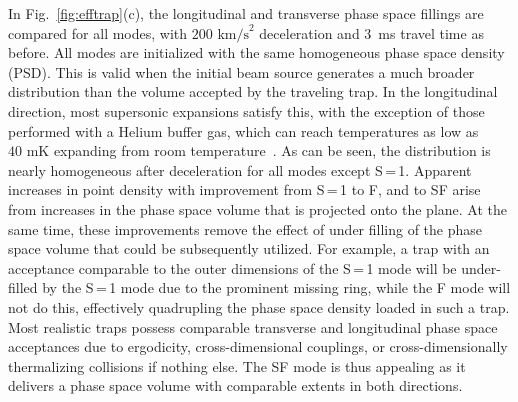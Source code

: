 \documentclass[%
 reprint,
 amsmath,amssymb,
 aps,
prl,
]{revtex4-1}
\begin{document}
In Fig.~\ref{fig:efftrap}(c), the longitudinal and transverse phase space fillings are compared for all modes, with $200\text{ km/s}^2$ deceleration and $3$~ms travel time as before. 
All modes are initialized with the same homogeneous phase space density (PSD).
This is valid when the initial beam source generates a much broader distribution than the volume accepted by the traveling trap.
In the longitudinal direction, most supersonic expansions satisfy this, with the exception of those performed with a Helium buffer gas, which can reach temperatures as low as $40\text{ mK}$ expanding from room temperature~\cite{Even2014}.
As can be seen, the distribution is nearly homogeneous after deceleration for all modes except S\,=\,1.
Apparent increases in point density with improvement from S\,=\,1 to F, and to SF arise from increases in the phase space volume that is projected onto the plane.
At the same time, these improvements remove the effect of under filling of the phase space volume that could be subsequently utilized.
For example, a trap with an acceptance comparable to the outer dimensions of the S\,=\,1 mode will be under-filled by the S\,=\,1 mode due to the prominent missing ring, while the F mode will not do this, effectively quadrupling the phase space density loaded in such a trap.
Most realistic traps possess comparable transverse and longitudinal phase space acceptances due to ergodicity, cross-dimensional couplings, or cross-dimensionally thermalizing collisions if nothing else. The SF mode is thus appealing as it delivers a phase space volume with comparable extents in both directions. 
\end{document}

